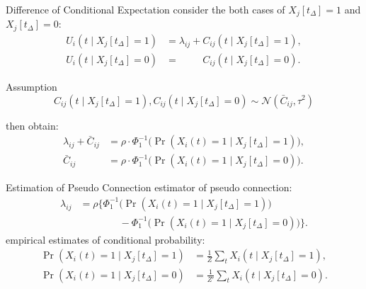 \documentclass[fleqn,aspectratio=1610]{beamer}
\begin{document}
\begin{frame}[label={sec:orge09b540}]{Difference of Conditional Expectation}
consider the both cases of \(X_j[t_{\Delta}]=1\) and \(X_j[t_{\Delta}]=0\):
\begin{align}
  U_{i}(t\mid X_j[t_{\Delta}]\!=\!1)
  &= \lambda_{ij} +
    C_{ij}(t\mid X_j[t_{\Delta}]\!=\!1),\\
  U_{i}(t\mid X_j[t_{\Delta}]\!=\!0)
  &= \phantom{\lambda_{ij} + {}}
    C_{ij}(t\mid X_j[t_{\Delta}]\!=\!0).
\end{align}
\pause
\begin{alertblock}{Assumption}
\begin{equation}
  C_{ij}(t\mid X_j[t_{\Delta}]\!=\!1),
  C_{ij}(t\mid X_j[t_{\Delta}]\!=\!0)
  \sim\mathcal{N}(\bar{C}_{ij},\tau^{2})
\end{equation}
\end{alertblock}
\pause
then obtain:
\begin{align}
  \lambda_{ij} + \bar{C}_{ij}
  &= \rho\cdot\Phi^{-1}_{1}\bigl(\Pr(X_i(t)\!=\!1 \mid X_j[t_{\Delta}]\!=\!1)\bigr),\\
  \bar{C}_{ij}
  &= \rho\cdot\Phi^{-1}_{1}\bigl(\Pr(X_i(t)\!=\!1 \mid X_j[t_{\Delta}]\!=\!0)\bigr).
\end{align}
\end{frame}

\begin{frame}[label={sec:orgb208fd9}]{Estimation of Pseudo Connection}
estimator of pseudo connection:
\begin{align}
  \lambda_{ij}
  &=\rho\bigl\{\Phi^{-1}_{1}\bigl(\Pr(X_i(t)\!=\!1 \mid X_j[t_{\Delta}]\!=\!1)\bigr)\\
  &\qquad\qquad
    - \Phi^{-1}_{1}\bigl(\Pr(X_i(t)\!=\!1 \mid X_j[t_{\Delta}]\!=\!0)\bigr)
    \bigr\}.
\end{align}
empirical estimates of conditional probability:
\begin{align}
  \Pr(X_i(t)\!=\!1 \mid X_j[t_{\Delta}]\!=\!1)
  &= \frac{1}{Z}\sum_{t} X_i(t \mid X_j[t_\Delta]\!=\!1),\\
  \Pr(X_i(t)\!=\!1 \mid X_j[t_{\Delta}]\!=\!0)
  &= \frac{1}{Z'}\sum_{t} X_i(t \mid X_j[t_\Delta]\!=\!0).
\end{align}
\end{frame}
\end{document}
